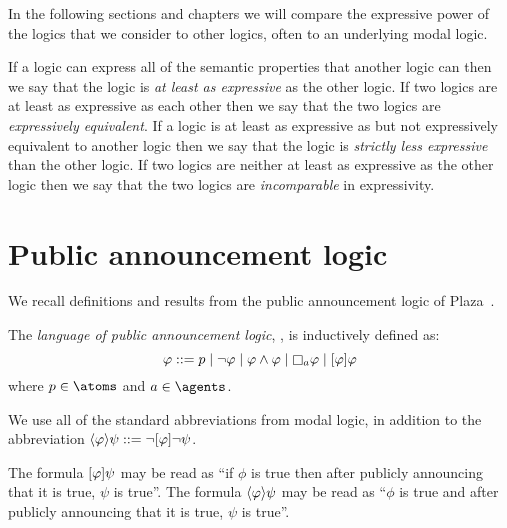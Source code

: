 In the following sections and chapters we will compare the expressive power of the logics that we consider to other logics, often to an underlying modal logic.

\begin{definition}[Expressivity]
If a logic can express all of the semantic properties that another logic can then we say that the logic is {\em at least as expressive} as the other logic.
If two logics are at least as expressive as each other then we say that the two logics are {\em expressively equivalent}.
If a logic is at least as expressive as but not expressively equivalent to another logic then we say that the logic is {\em strictly less expressive} than the other logic.
If two logics are neither at least as expressive as the other logic then we say that the two logics are {\em incomparable} in expressivity.
\end{definition}

\section{Public announcement logic}\label{pal}

We recall definitions and results from the public announcement logic of Plaza~\cite{plaza:1989}.

\begin{definition}
The {\em language of public announcement logic}, \langPal{}, is inductively defined as:
$$
\phi ::= 
    \atomP \mid
    \lnot \phi \mid
    \phi \land \phi \mid
    \necessaryA \phi \mid
    \announceA{\phi} \phi
$$
where $\atomP \in \atoms$ and $\agentA \in \agents$.
\end{definition}

We use all of the standard abbreviations from modal logic, in addition to the abbreviation $\langle \varphi \rangle \psi ::= \lnot [ \varphi ] \lnot \psi$.

The formula $[ \varphi ] \psi$ may be read as ``if $\phi$ is true then after publicly announcing that it is true, $\psi$ is true''.
The formula $\langle \varphi \rangle \psi$ may be read as ``$\phi$ is true and after publicly announcing that it is true, $\psi$ is true''.

